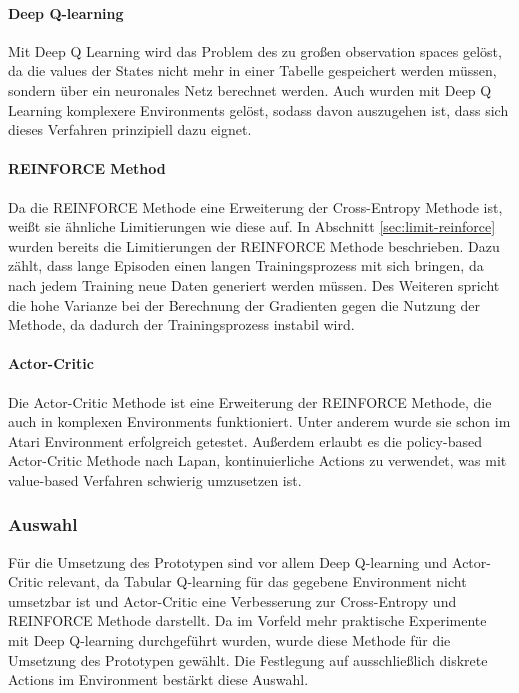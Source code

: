 \documentclass[11pt]{scrartcl}
\begin{document}
\paragraph{Deep Q-learning}
Mit Deep Q Learning wird das Problem des zu großen observation spaces gelöst, da die
values der States nicht mehr in einer Tabelle gespeichert werden müssen, sondern über ein
neuronales Netz berechnet werden. Auch wurden mit Deep Q Learning komplexere Environments
gelöst, sodass davon auszugehen ist, dass sich dieses Verfahren prinzipiell dazu eignet.

\paragraph{REINFORCE Method}
Da die REINFORCE Methode eine Erweiterung der Cross-Entropy Methode ist, weißt sie
ähnliche Limitierungen wie diese auf. In Abschnitt \ref{sec:limit-reinforce} wurden
bereits die Limitierungen der REINFORCE Methode beschrieben. Dazu zählt, dass lange
Episoden einen langen Trainingsprozess mit sich bringen, da nach jedem Training neue 
Daten generiert werden müssen. Des Weiteren spricht die hohe Varianze bei der Berechnung
der Gradienten gegen die Nutzung der Methode, da dadurch der Trainingsprozess instabil
wird.

\paragraph{Actor-Critic}
Die Actor-Critic Methode ist eine Erweiterung der REINFORCE Methode, die auch in komplexen
Environments funktioniert. Unter anderem wurde sie schon im Atari Environment erfolgreich
getestet. Außerdem erlaubt es die policy-based Actor-Critic Methode nach Lapan,
kontinuierliche Actions zu verwendet, was \cite[~S.346]{L2018} mit value-based Verfahren
schwierig umzusetzen ist.

\subsubsection{Auswahl}
Für die Umsetzung des Prototypen sind vor allem Deep Q-learning und Actor-Critic relevant,
da Tabular Q-learning für das gegebene Environment nicht umsetzbar ist und Actor-Critic
eine Verbesserung zur Cross-Entropy und REINFORCE Methode darstellt. Da im Vorfeld mehr
praktische Experimente mit Deep Q-learning durchgeführt wurden, wurde diese Methode für
die Umsetzung des Prototypen gewählt. Die Festlegung auf ausschließlich diskrete Actions
im Environment bestärkt diese Auswahl.
\end{document}
